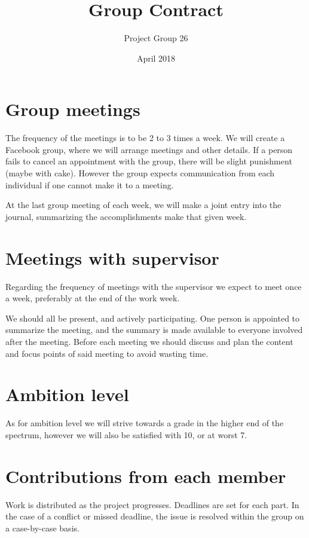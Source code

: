 \documentclass[11pt]{article}
\title{Group Contract}
\author{Project Group 26}
\date{April 2018}
\begin{document}
\maketitle

\section{Group meetings}

The frequency of the meetings is to be 2 to 3 times a week. We will create a Facebook group, where we will arrange meetings and other details. If a person fails to cancel an appointment with the group, there will be slight punishment (maybe with cake). However the group expects communication from each individual if one cannot make it to a meeting.

At the last group meeting of each week, we will make a joint entry into the journal, summarizing the accomplishments make that given week.

\section{Meetings with supervisor}

Regarding the frequency of meetings with the supervisor we expect to meet once a week, preferably at the end of the work week.

We should all be present, and actively participating. One person is appointed to summarize the meeting, and the summary is made available to everyone involved after the meeting. Before each meeting we should discuss and plan the content and focus points of said meeting to avoid wasting time. 

\section{Ambition level}

As for ambition level we will strive towards a grade in the higher end of the spectrum, however we will also be satisfied with 10, or at worst 7.

\section{Contributions from each member}

Work is distributed as the project progresses. Deadlines are set for each part. In the case of a conflict or missed deadline, the issue is resolved within the group on a case-by-case basis. 
\end{document}
